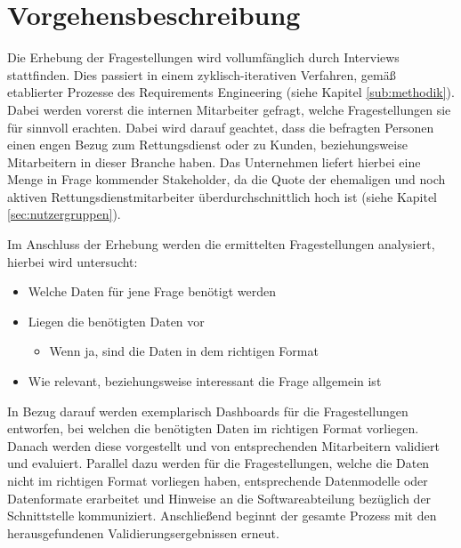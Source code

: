 \section{Vorgehensbeschreibung}
Die Erhebung der Fragestellungen wird vollumfänglich durch Interviews stattfinden.
Dies passiert in einem zyklisch-iterativen Verfahren, gemäß etablierter Prozesse des Requirements Engineering \cite{Pohl.2011} (siehe Kapitel \ref{sub:methodik}).
Dabei werden vorerst die internen Mitarbeiter gefragt, welche Fragestellungen sie für sinnvoll erachten.
Dabei wird darauf geachtet, dass die befragten Personen einen engen Bezug zum Rettungsdienst oder zu Kunden, beziehungsweise Mitarbeitern in dieser Branche haben.
Das Unternehmen liefert hierbei eine Menge in Frage kommender Stakeholder, da die Quote der ehemaligen und noch aktiven Rettungsdienstmitarbeiter überdurchschnittlich hoch ist (siehe Kapitel \ref{sec:nutzergruppen}). 


Im Anschluss der Erhebung werden die ermittelten Fragestellungen analysiert, hierbei wird untersucht:
\begin{itemize}
      \item Welche Daten für jene Frage benötigt werden
      \item Liegen die benötigten Daten vor
      \begin{itemize}
        \item Wenn ja, sind die Daten in dem richtigen Format
      \end{itemize}
      \item Wie relevant, beziehungsweise interessant die Frage allgemein ist
\end{itemize}
In Bezug darauf werden exemplarisch Dashboards für die Fragestellungen entworfen, bei welchen die benötigten Daten im richtigen Format vorliegen.
Danach werden diese vorgestellt und von entsprechenden Mitarbeitern validiert und evaluiert.
Parallel dazu werden für die Fragestellungen, welche die Daten nicht im richtigen Format vorliegen haben, entsprechende Datenmodelle oder Datenformate erarbeitet und Hinweise an die Softwareabteilung bezüglich der Schnittstelle kommuniziert.
Anschließend beginnt der gesamte Prozess mit den herausgefundenen Validierungsergebnissen erneut.




